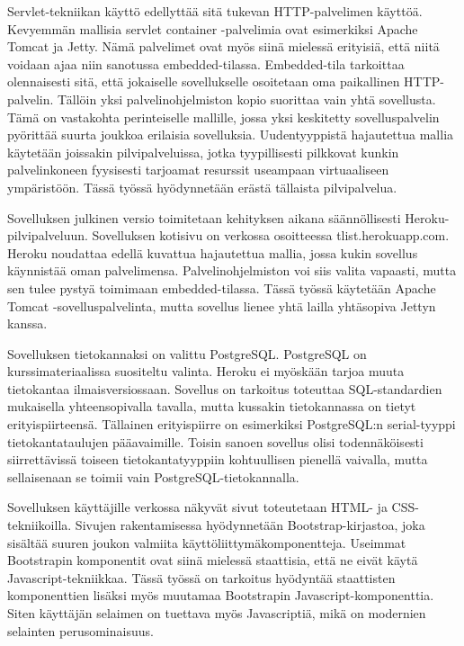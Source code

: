 \documentclass[12pt,a4paper,oneside,titlepage,pdftex]{article}
\begin{document}
Servlet-tekniikan käyttö edellyttää sitä tukevan HTTP-palvelimen käyttöä. Kevyemmän mallisia servlet container -palvelimia ovat esimerkiksi Apache Tomcat ja Jetty. Nämä palvelimet ovat myös siinä mielessä erityisiä, että niitä voidaan ajaa niin sanotussa embedded-tilassa. Embedded-tila tarkoittaa olennaisesti sitä, että jokaiselle sovellukselle osoitetaan oma paikallinen HTTP-palvelin. Tällöin yksi palvelinohjelmiston kopio suorittaa vain yhtä sovellusta. Tämä on vastakohta perinteiselle mallille, jossa yksi keskitetty sovelluspalvelin pyörittää suurta joukkoa erilaisia sovelluksia. Uudentyyppistä hajautettua mallia käytetään joissakin pilvipalveluissa, jotka tyypillisesti pilkkovat kunkin palvelinkoneen fyysisesti tarjoamat resurssit useampaan virtuaaliseen ympäristöön. Tässä työssä hyödynnetään erästä tällaista pilvipalvelua.

Sovelluksen julkinen versio toimitetaan kehityksen aikana säännöllisesti Heroku\hyp{}pilvipalveluun. Sovelluksen kotisivu on verkossa osoitteessa tlist.herokuapp.com. Heroku noudattaa edellä kuvattua hajautettua mallia, jossa kukin sovellus käynnistää oman palvelimensa. Palvelinohjelmiston voi siis valita vapaasti, mutta sen tulee pystyä toimimaan embedded-tilassa. Tässä työssä käytetään Apache Tomcat -sovelluspalvelinta, mutta sovellus lienee yhtä lailla yhtäsopiva Jettyn kanssa.

Sovelluksen tietokannaksi on valittu PostgreSQL. PostgreSQL on kurssimateriaalissa suositeltu valinta. Heroku ei myöskään tarjoa muuta tietokantaa ilmaisversiossaan. Sovellus on tarkoitus toteuttaa SQL-standardien mukaisella yhteensopivalla tavalla, mutta kussakin tietokannassa on tietyt erityispiirteensä. Tällainen erityispiirre on esimerkiksi PostgreSQL:n serial-tyyppi tietokantataulujen pääavaimille. Toisin sanoen sovellus olisi todennäköisesti siirrettävissä toiseen tietokantatyyppiin kohtuullisen pienellä vaivalla, mutta sellaisenaan se toimii vain PostgreSQL-tietokannalla.

Sovelluksen käyttäjille verkossa näkyvät sivut toteutetaan HTML- ja CSS-tekniikoilla. Sivujen rakentamisessa hyödynnetään Bootstrap-kirjastoa, joka sisältää suuren joukon valmiita käyttöliittymäkomponentteja. Useimmat Bootstrapin komponentit ovat siinä mielessä staattisia, että ne eivät käytä Javascript-tekniikkaa. Tässä työssä on tarkoitus hyödyntää staattisten komponenttien lisäksi myös muutamaa Bootstrapin Javascript-komponenttia. Siten käyttäjän selaimen on tuettava myös Javascriptiä, mikä on modernien selainten perusominaisuus.
\end{document}
